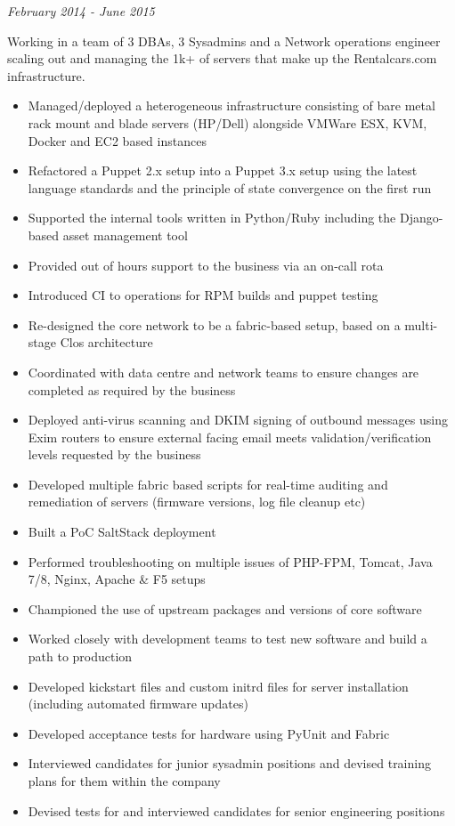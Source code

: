 \emph{February 2014 - June 2015}

Working in a team of 3 DBAs, 3 Sysadmins and a Network operations
engineer scaling out and managing the 1k+ of servers that make up the
Rentalcars.com infrastructure.

\begin{itemize}
\itemsep1pt\parskip0pt
\item
  Managed/deployed a heterogeneous infrastructure consisting of bare
  metal rack mount and blade servers (HP/Dell) alongside VMWare ESX,
  KVM, Docker and EC2 based instances
\item
  Refactored a Puppet 2.x setup into a Puppet 3.x setup using the latest
  language standards and the principle of state convergence on the first
  run
\item
  Supported the internal tools written in Python/Ruby including the
  Django-based asset management tool
\item
  Provided out of hours support to the business via an on-call rota
\item
  Introduced CI to operations for RPM builds and puppet testing
\item
  Re-designed the core network to be a fabric-based setup, based on a
  multi-stage Clos architecture
\item
  Coordinated with data centre and network teams to ensure changes are
  completed as required by the business
\item
  Deployed anti-virus scanning and DKIM signing of outbound messages
  using Exim routers to ensure external facing email meets
  validation/verification levels requested by the business
\item
  Developed multiple fabric based scripts for real-time auditing and
  remediation of servers (firmware versions, log file cleanup etc)
\item
  Built a PoC SaltStack deployment
\item
  Performed troubleshooting on multiple issues of PHP-FPM, Tomcat, Java
  7/8, Nginx, Apache \& F5 setups
\item
  Championed the use of upstream packages and versions of core software
\item
  Worked closely with development teams to test new software and build a
  path to production
\item
  Developed kickstart files and custom initrd files for server
  installation (including automated firmware updates)
\item
  Developed acceptance tests for hardware using PyUnit and Fabric
\item
  Interviewed candidates for junior sysadmin positions and devised
  training plans for them within the company
\item
  Devised tests for and interviewed candidates for senior engineering
  positions
\end{itemize}

